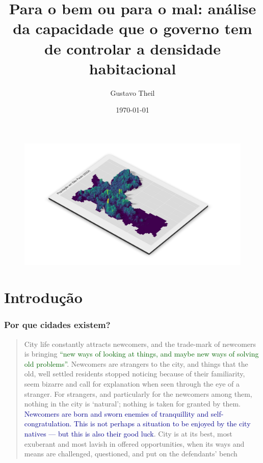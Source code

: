 \documentclass[%
    8pt, 
    aspectratio=169,
]{beamer}
\title{Para o bem ou para o mal: \newline análise da capacidade que o governo tem de controlar a densidade habitacional}
\author{Gustavo Theil}
\date{\today}
\begin{document}
\begin{frame}[plain]{}
    \begin{figure}
        \includegraphics[width = \paperwidth, height = \paperheight]{imagens/mapa3d.png}
    \end{figure}
\end{frame}

\frame{\titlepage}


\section{Introdução}

\begin{frame}
    \frametitle{Por que cidades existem?}
    \begin{quote}
        City life constantly attracts newcomers, and the trade-mark of newcomers is bringing \textcolor{DarkGreen}{``new ways of looking at things, and maybe new ways of solving old problems''}. Newcomers are strangers to the city, and things that the old, well settled residents stopped noticing because of their familiarity, seem bizarre and call for explanation when seen through the eye of a stranger. For strangers, and particularly for the newcomers among them, nothing in the city is `natural'; nothing is taken for granted by them. \textcolor{DarkBlue}{Newcomers are born and sworn enemies of tranquillity and self-congratulation. This is not perhaps a situation to be enjoyed by the city natives --- but this is also their good luck}. City is at its best, most exuberant and most lavish in offered opportunities, when its ways and means are challenged, questioned, and put on the defendants' bench

    \end{quote}
\end{frame}
\end{document}
